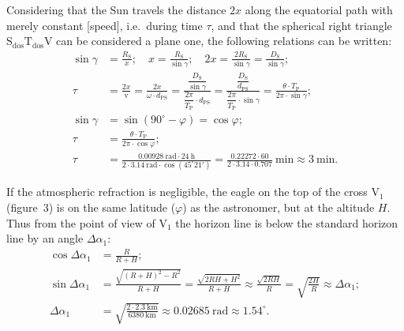 \begin{description}
  Considering that the Sun travels the distance $2x$ along the equatorial
  path with merely constant [speed], i.e.\ during time $\tau$, and that the
  spherical right triangle $\mathrm{S_{dos}}\mathrm{T_{dos}}\mathrm{V}$ can
  be considered a plane one, the following relations can be written:
  \begin{align*}
  \sin\gamma &= \frac{R_{\mathrm{S}}}{x};\quad
    x = \frac{R_{\mathrm{S}}}{\sin\gamma};\quad
    2x = \frac{2R_{\mathrm{S}}}{\sin\gamma}
       = \frac{D_{\mathrm{S}}}{\sin\gamma};\\
  \tau &= \frac{2x}{\mathrm{v}}
    = \frac{2x}{\omega\cdot d_{\mathrm{PS}}}
    = \frac{\dfrac{D_{\mathrm{S}}}{\sin\gamma}}
           {\dfrac{2\pi}{T_{\mathrm{P}}}\cdot d_{\mathrm{PS}}}
    = \frac{\dfrac{D_{\mathrm{S}}}{d_{\mathrm{PS}}}}
           {\dfrac{2\pi}{T_{\mathrm{P}}}\cdot\sin\gamma}
    = \frac{\theta\cdot T_{\mathrm{P}}}{2\pi\cdot\sin\gamma};\\
  \sin\gamma &= \sin(90^\circ - \varphi) = \cos\varphi;\\
  \tau &= \frac{\theta\cdot T_{\mathrm{P}}}{2\pi\cdot\cos\varphi};\\
  \tau &= \frac{0.00928\ \mathrm{rad}\cdot 24\ \mathrm{h}}
              {2\cdot 3.14\ \mathrm{rad}\cdot\cos(45^\circ 21')}
    = \frac{0.22272\cdot 60}{2\cdot 3.14\cdot 0.707}\ \mathrm{min}
    \approx 3\ \mathrm{min}.
  \end{align*}

\item[A.2)] If the atmospheric refraction is negligible, the eagle on the
  top of the cross $\mathrm{V}_1$ (figure~3) is on the same latitude
  ($\varphi$) as the astronomer, but at the altitude $H$. Thus from the point
  of view of $\mathrm{V}_1$ the horizon line is below the standard horizon
  line by an angle $\Delta\alpha_1$:
  \begin{align*}
  \cos\Delta\alpha_1 &= \frac{R}{R+H};\\
  \sin\Delta\alpha_1 &= \frac{\sqrt{(R+H)^2 - R^2}}{R+H}
    = \frac{\sqrt{2RH + H^2}}{R+H}
    \approx \frac{\sqrt{2RH}}{R}
    = \sqrt{\frac{2H}{R}} \approx \Delta\alpha_1;\\
  \Delta\alpha_1 &= \sqrt{\frac{2\cdot 2.3\ \mathrm{km}}{6380\ \mathrm{km}}}
    \approx 0.02685\ \mathrm{rad} \approx 1.54^\circ.
  \end{align*}


\end{description}
